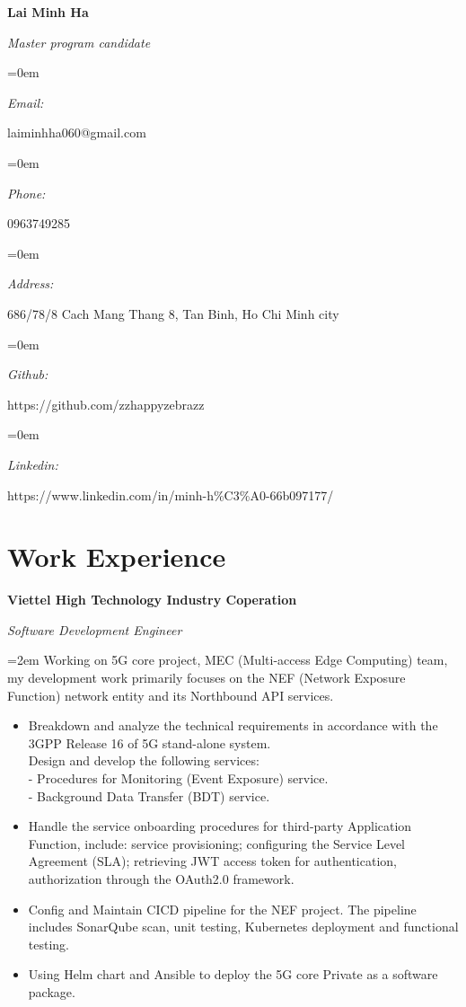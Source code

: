 \documentclass[10pt]{article}
\newlength{\spacebox}
\newcommand{\name}[1]{
\Huge %
\fontfamily{phv}\selectfont %
\begin{center} \textbf{#1} \end{center}\par
\normalsize\normalfont}
\newcommand{\motto}[1]{
  \large %
  \fontfamily{phv}\selectfont %
  \begin{center} \textsl{#1}\end{center}\par
  \normalsize \normalfont}
\newcommand{\info}[2]{
  \noindent\hangindent=0em\hangafter=0
  \parbox{\spacebox}{%
  \textit{#1}} %
  #2 \par} %
\newcommand{\work}[4]{
  \noindent  \textbf{#1}
  \hfill 
\framebox{%
  \parbox{9em}{%
  \centering\textbf{#2}}} \par
  \noindent \textit{#3} \par
  \vspace*{0.5em}
  \noindent\hangindent=2em\hangafter=0 \small #4 
\normalsize \par}
\begin{document}
\name{Lai Minh Ha}
\vspace*{-15pt}
\motto{Master program candidate}

\info{Email:}{laiminhha060@gmail.com}
\info{Phone:}{0963749285}
\info{Address:}{686/78/8 Cach Mang Thang 8, Tan Binh, Ho Chi Minh city}
\info{Github:}{https://github.com/zzhappyzebrazz}
\info{Linkedin:}{https://www.linkedin.com/in/minh-h\%C3\%A0-66b097177/}

\section*{Work Experience}
\work{Viettel High Technology Industry Coperation}
{May 2023--Now}
{Software Development Engineer}
{Working on 5G core project, MEC (Multi-access Edge Computing) team, my development work primarily focuses on the NEF (Network Exposure Function) network entity and its Northbound API services.

\begin{itemize}
    \item Breakdown and analyze the technical requirements in accordance with the 3GPP Release 16 of 5G stand-alone system.
    \\ Design and develop the following services:
    \\ - Procedures for Monitoring (Event Exposure) service.
    \\ - Background Data Transfer (BDT) service.
    \item Handle the service onboarding procedures for third-party Application Function, include: service provisioning; configuring the Service Level Agreement (SLA); retrieving JWT access token for authentication, authorization through the OAuth2.0 framework.
    \item Config and Maintain CICD pipeline for the NEF project. The pipeline includes SonarQube scan, unit testing, Kubernetes deployment and functional testing.
    \item Using Helm chart and Ansible to deploy the 5G core Private as a software package.
\end{itemize}}
\end{document}
